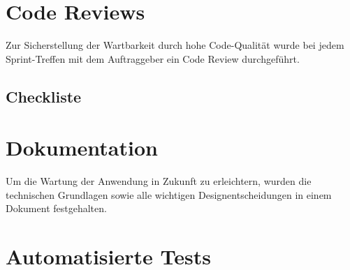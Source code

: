 



\clearpage


\section{Code Reviews}

Zur Sicherstellung der Wartbarkeit durch hohe Code-Qualität wurde bei jedem
Sprint-Treffen mit dem Auftraggeber ein Code Review durchgeführt.


\subsection{Checkliste}






\clearpage
\section{Dokumentation}

Um die Wartung der Anwendung in Zukunft zu erleichtern, wurden die technischen Grundlagen
sowie alle wichtigen Designentscheidungen in einem Dokument festgehalten.






\clearpage
\section{Automatisierte Tests}

